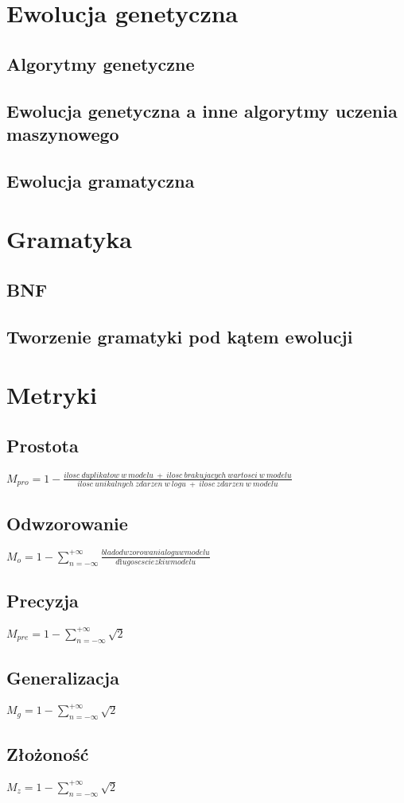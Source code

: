 \section{Ewolucja genetyczna}
\label{sec:ewolucjaGenetyczne}
\subsection{Algorytmy genetyczne}
\cite{10.5555/138936}
\subsection{Ewolucja genetyczna a inne algorytmy uczenia maszynowego}
\subsection{Ewolucja gramatyczna}


\section{Gramatyka}
\label{sec:gramatyka}
\subsection{BNF}
\subsection{Tworzenie gramatyki pod kątem ewolucji}


\section{Metryki}
\label{sec:metryki}
\cite{doi:10.1142/S0218843014400012}
\subsection{Prostota}
$M_{pro} = 1 - \frac{ilosc\ duplikatow\ w\ modelu\ +\ ilosc\ brakujacych\ wartosci\ w\ modelu}{ilosc\ unikalnych\ zdarzen\ w\ logu\ +\ ilosc\ zdarzen\ w\ modelu}$
\subsection{Odwzorowanie}
$M_o = 1 - \sum_{n=-\infty}^{+\infty} \frac{blad odwzorowania logu w modelu}{długosc sciezki w modelu}  $
\subsection{Precyzja}
$M_{pre} = 1 - \sum_{n=-\infty}^{+\infty} \sqrt{2} $
\subsection{Generalizacja}
$M_g = 1 - \sum_{n=-\infty}^{+\infty} \sqrt{2} $
\subsection{Złożoność}
$M_z = 1 - \sum_{n=-\infty}^{+\infty} \sqrt{2} $
